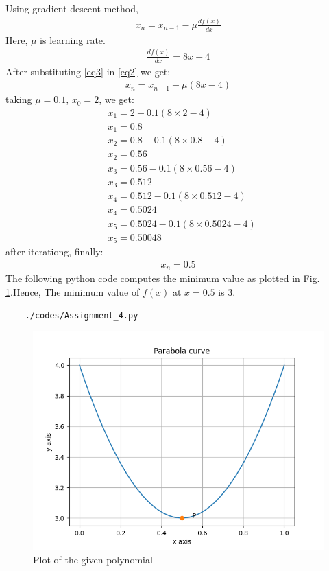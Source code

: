 \documentclass[journal,12pt,twocolumn]{IEEEtran}
\begin{document}
    Using gradient descent method,
    \begin{align}
    x_n=x_{n-1}-\mu\frac{df(x)}{dx} \label{eq2}
    \end{align}
    Here, $\mu$ is learning rate.\\
    \begin{align}
    \frac{df(x)}{dx}=8x-4 \label{eq3}
\end{align}
After substituting \ref{eq3} in \ref{eq2} we get:
\begin{align}
x_n=x_{n-1}-\mu( 8x-4)
\end{align}
taking $\mu=0.1$, $x_0=2$, we get:
\begin{align}
&x_1=2-0.1(8\times2-4)\\
&x_1=0.8\\
&x_2=0.8-0.1(8\times 0.8 -4)\\
&x_2=0.56\\
&x_3=0.56-0.1(8\times 0.56 -4)\\
&x_3=0.512\\
&x_4=0.512-0.1(8\times 0.512-4)\\
&x_4=0.5024\\
&x_5=0.5024-0.1(8\times 0.5024 -4)\\
&x_5=0.50048
\end{align}
after iterationg, finally:
    \begin{align}
    x_n=0.5
    \end{align}
The following python code computes the minimum value as plotted in Fig. \ref{fig:5.1}.Hence, The minimum value of $f(x)$ at $x=0.5$ is 3.
	\begin{lstlisting}
	./codes/Assignment_4.py
	\end{lstlisting}
		\begin{figure}[!ht]
	\centering
	\includegraphics[width=\columnwidth]{Figure_1.png}
	\caption{Plot of the given polynomial}
	\label{fig:5.1}	
	\end{figure}
\end{document}
